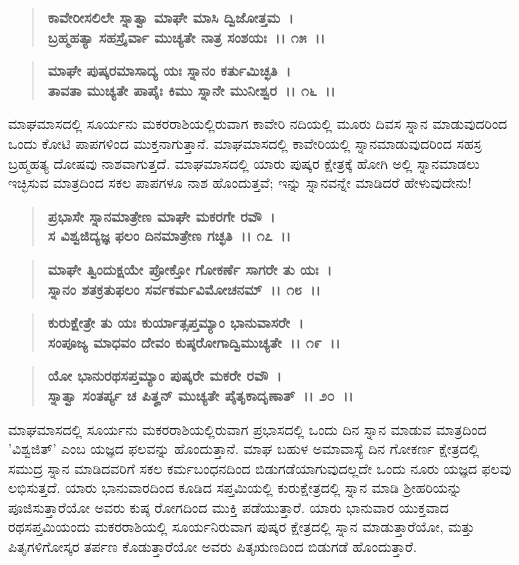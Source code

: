 \begin{verse}
\textbf{ಕಾವೇರೀಸಲಿಲೇ ಸ್ನಾತ್ವಾ ಮಾಘೇ ಮಾಸಿ ದ್ವಿಜೋತ್ತಮ~।}\\\textbf{ಬ್ರಹ್ಮಹತ್ಯಾ ಸಹಸ್ರೈರ್ವಾ ಮುಚ್ಯತೇ ನಾತ್ರ ಸಂಶಯಃ~।। ೧೫~।।} 
\end{verse}

\begin{verse}
\textbf{ಮಾಘೇ ಪುಷ್ಕರಮಾಸಾದ್ಯ ಯಃ ಸ್ನಾನಂ ಕರ್ತುಮಿಚ್ಛತಿ~।}\\\textbf{ತಾವತಾ ಮುಚ್ಯತೇ ಪಾಪೈಃ ಕಿಮು ಸ್ನಾನೇ ಮುನೀಶ್ವರ~।। ೧೬~।।}
\end{verse}

ಮಾಘಮಾಸದಲ್ಲಿ ಸೂರ್ಯನು ಮಕರರಾಶಿಯಲ್ಲಿರುವಾಗ ಕಾವೇರಿ ನದಿಯಲ್ಲಿ ಮೂರು ದಿವಸ ಸ್ನಾನ ಮಾಡುವುದರಿಂದ ಒಂದು ಕೋಟಿ ಪಾಪಗಳಿಂದ ಮುಕ್ತನಾಗುತ್ತಾನೆ. ಮಾಘಮಾಸದಲ್ಲಿ ಕಾವೇರಿಯಲ್ಲಿ ಸ್ನಾನಮಾಡುವುದರಿಂದ ಸಹಸ್ರ ಬ್ರಹ್ಮಹತ್ಯ ದೋಷವು ನಾಶವಾಗುತ್ತದೆ. ಮಾಘಮಾಸದಲ್ಲಿ ಯಾರು ಪುಷ್ಕರ ಕ್ಷೇತ್ರಕ್ಕೆ ಹೋಗಿ ಅಲ್ಲಿ ಸ್ನಾನಮಾಡಲು ಇಚ್ಛಿಸುವ ಮಾತ್ರದಿಂದ ಸಕಲ ಪಾಪಗಳೂ ನಾಶ ಹೊಂದುತ್ತವೆ; ಇನ್ನು ಸ್ನಾನವನ್ನೇ ಮಾಡಿದರೆ ಹೇಳುವುದೇನು!

\begin{verse}
\textbf{ಪ್ರಭಾಸೇ ಸ್ನಾನಮಾತ್ರೇಣ ಮಾಘೇ ಮಕರಗೇ ರವೌ~।}\\\textbf{ಸ ವಿಶ್ವಜಿದ್ಯಜ್ಞ ಫಲಂ ದಿನಮಾತ್ರೇಣ ಗಚ್ಛತಿ~।। ೧೭~।। }
\end{verse}

\begin{verse}
\textbf{ಮಾಘೇ ತ್ವಿಂದುಕ್ಷಯೇ ಪ್ರೋಕ್ತೋ ಗೋಕರ್ಣೆ ಸಾಗರೇ ತು ಯಃ~।}\\\textbf{ಸ್ನಾನಂ ಶತಕ್ರತುಫಲಂ ಸರ್ವಕರ್ಮವಿಮೋಚನಮ್~।। ೧೮~।। }
\end{verse}

\begin{verse}
\textbf{ಕುರುಕ್ಷೇತ್ರೇ ತು ಯಃ ಕುರ್ಯಾತ್ಸಪ್ತಮ್ಯಾಂ ಭಾನುವಾಸರೇ~।}\\\textbf{ಸಂಪೂಜ್ಯ ಮಾಧವಂ ದೇವಂ ಕುಷ್ಠರೋಗಾದ್ವಿಮುಚ್ಯತೇ~।। ೧೯~।।} 
\end{verse}

\begin{verse}
\textbf{ಯೋ ಭಾನುರಥಸಪ್ತಮ್ಯಾಂ ಪುಷ್ಕರೇ ಮಕರೇ ರವೌ~।}\\\textbf{ಸ್ನಾತ್ವಾ ಸಂತರ್ಪ್ಯ ಚ ಪಿತೄನ್ ಮುಚ್ಯತೇ ಪೈತೃಕಾದೃಣಾತ್~।। ೨೦~।।}
\end{verse}

ಮಾಘಮಾಸದಲ್ಲಿ ಸೂರ್ಯನು ಮಕರರಾಶಿಯಲ್ಲಿರುವಾಗ ಪ್ರಭಾಸದಲ್ಲಿ ಒಂದು ದಿನ ಸ್ನಾನ ಮಾಡುವ ಮಾತ್ರದಿಂದ 'ವಿಶ್ವಜಿತ್' ಎಂಬ ಯಜ್ಞದ ಫಲವನ್ನು ಹೊಂದುತ್ತಾನೆ. ಮಾಘ ಬಹುಳ ಅಮಾವಾಸ್ಯೆ ದಿನ ಗೋಕರ್ಣ ಕ್ಷೇತ್ರದಲ್ಲಿ ಸಮುದ್ರ ಸ್ನಾನ ಮಾಡಿದವರಿಗೆ ಸಕಲ ಕರ್ಮಬಂಧನದಿಂದ ಬಿಡುಗಡೆಯಾಗುವುದಲ್ಲದೇ ಒಂದು ನೂರು ಯಜ್ಞದ ಫಲವು ಲಭಿಸುತ್ತದೆ. ಯಾರು ಭಾನುವಾರದಿಂದ ಕೂಡಿದ ಸಪ್ತಮಿಯಲ್ಲಿ ಕುರುಕ್ಷೇತ್ರದಲ್ಲಿ ಸ್ನಾನ ಮಾಡಿ ಶ‍್ರೀಹರಿಯನ್ನು ಪೂಜಿಸುತ್ತಾರೆಯೋ ಅವರು ಕುಷ್ಠ ರೋಗದಿಂದ ಮುಕ್ತಿ ಪಡೆಯುತ್ತಾರೆ. ಯಾರು ಭಾನುವಾರ ಯುಕ್ತವಾದ ರಥಸಪ್ತಮಿಯಂದು ಮಕರರಾಶಿಯಲ್ಲಿ ಸೂರ್ಯನಿರುವಾಗ ಪುಷ್ಕರ ಕ್ಷೇತ್ರದಲ್ಲಿ ಸ್ನಾನ ಮಾಡುತ್ತಾರೆಯೋ, ಮತ್ತು ಪಿತೃಗಳಿಗೋಸ್ಕರ ತರ್ಪಣ ಕೊಡುತ್ತಾರೆಯೋ ಅವರು ಪಿತೃಋಣದಿಂದ ಬಿಡುಗಡೆ ಹೊಂದುತ್ತಾರೆ.

